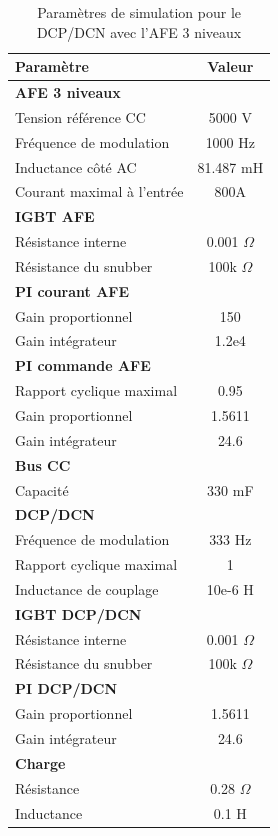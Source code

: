 \begin{table}[htb]
\centering
\begin{tabular}{|l|c|} 
  \hline
  \textbf{Paramètre} & \textbf{Valeur}  \\
  \hline\hline \hline
  \multicolumn{2}{|l|}{\textbf{AFE 3 niveaux}}\\ \hline \hline 
  Tension référence CC & 5000 V\\ \hline
  Fréquence de modulation & 1000 Hz \\ \hline
  Inductance côté AC& 81.487 mH\\ \hline
  Courant maximal à l'entrée& 800A \\ \hline \hline
  \multicolumn{2}{|l|}{\textbf{IGBT AFE}}\\ \hline
  Résistance interne & 0.001 $\Omega$\\
  Résistance du snubber & 100k $\Omega$\\ \hline \hline
   \multicolumn{2}{|l|}{\textbf{PI courant AFE}}\\ \hline
  Gain proportionnel & 150 \\
  Gain intégrateur & 1.2e4 \\ \hline \hline
  \multicolumn{2}{|l|}{\textbf{PI commande AFE}}\\ \hline
  Rapport cyclique maximal & 0.95\\
  Gain proportionnel & 1.5611 \\
  Gain intégrateur & 24.6 \\ \hline \hline
  \multicolumn{2}{|l|}{\textbf{Bus CC}}\\ \hline
  Capacité & 330 mF\\
  \hline \hline \hline
  
  \multicolumn{2}{|l|}{\textbf{DCP/DCN}}\\ \hline \hline
  Fréquence de modulation & 333 Hz\\ \hline
  Rapport cyclique maximal & 1 \\ \hline
  Inductance de couplage & 10e-6 H \\ \hline \hline
  \multicolumn{2}{|l|}{\textbf{IGBT DCP/DCN}}\\ \hline
  Résistance interne & 0.001 $\Omega$\\
  Résistance du snubber & 100k $\Omega$\\ \hline \hline
   \multicolumn{2}{|l|}{\textbf{PI DCP/DCN}}\\ \hline
  Gain proportionnel & 1.5611 \\
  Gain intégrateur & 24.6 \\ \hline \hline
  \multicolumn{2}{|l|}{\textbf{Charge}}\\ \hline
  Résistance & 0.28 $\Omega$\\
  Inductance & 0.1 H \\
  \hline
\end{tabular}
\caption{Paramètres de simulation pour le DCP/DCN avec l'AFE 3 niveaux}
\label{p_AF_DCP}
\end{table}
\clearpage


